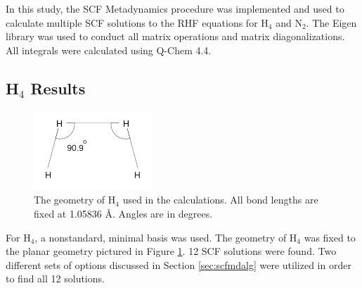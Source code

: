 \documentclass[final,3p,times,twocolumn]{elsarticle}
\begin{document}
In this study, the SCF Metadynamics procedure was implemented and used to calculate multiple SCF solutions to the RHF equations for H$_4$ and N$_2$. The Eigen library\cite{eigen} was used to conduct all matrix operations and matrix diagonalizations. All integrals were calculated using Q-Chem 4.4.\cite{qchem}

\subsection{H$_4$ Results} \label{sec:h4results}

\begin{figure}
\centering
\includegraphics[width=0.4\textwidth]{h4_geo.png}
\caption{The geometry of H$_4$ used in the calculations. All bond lengths are fixed at 1.05836 \AA. Angles are in degrees.}
\label{fig:h4geo}
\end{figure}

For H$_4$, a nonstandard, minimal basis was used.\cite{h4basis} The geometry of H$_4$ was fixed to the planar geometry pictured in Figure \ref{fig:h4geo}. 12 SCF solutions were found. Two different sets of options discussed in Section \ref{sec:scfmdalg}  were utilized in order to find all 12 solutions.
\end{document}
